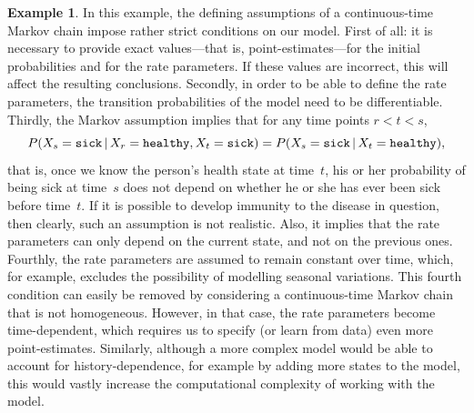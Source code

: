 \documentclass[10pt,a4paper]{paper}
\theoremstyle{definition}
\newtheorem{exmp}{Example}%
\begin{document}
\begin{exmp}
In this example, the defining assumptions of a continuous-time Markov chain impose rather strict conditions on our model. 
First of all: it is necessary to provide exact values---that is, point-estimates---for the initial probabilities and for the rate parameters. If these values are incorrect, this will affect the resulting conclusions.
Secondly, in order to be able to define the rate parameters, the transition probabilities of the model need to be differentiable.
Thirdly, the Markov assumption implies that for any time points $r<t<s$,
\begin{equation*}
P(X_s={\tt sick}\,\vert\, X_r={\tt healthy}, X_t={\tt sick}) = P(X_s={\tt sick}\,\vert\, X_t={\tt healthy}),
\end{equation*}
that is, once we know the person's health state at time~$t$, his or her probability of being sick at time~$s$ does not depend on whether he or she has ever been sick before time~$t$. If it is possible to develop immunity to the disease in question, then clearly, such an assumption is not realistic. Also, it implies that the rate parameters can only depend on the current state, and not on the previous ones.
Fourthly, the rate parameters are assumed to remain constant over time, which, for example, excludes the possibility of modelling seasonal variations. This fourth condition can easily be removed by considering a continuous-time Markov chain that is not homogeneous. However, in that case, the rate parameters become time-dependent, which requires us to specify (or learn from data) even more point-estimates. Similarly, although a more complex model would be able to account for history-dependence, for example by adding more states to the model, this would vastly increase the computational complexity of working with the model. %






\end{exmp}
\end{document}
